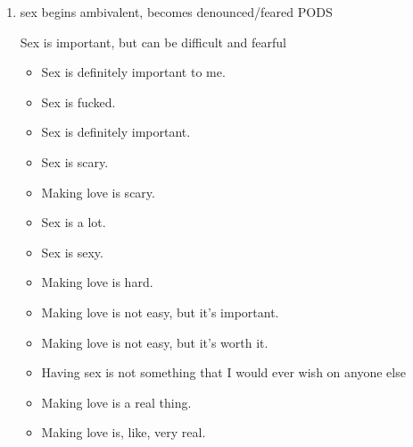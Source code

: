 \documentclass[11pt]{article}
\begin{document}
\begin{enumerate}
\begin{enumerate}
POSTPODS
Intimacy described as desired but deferred:
\begin{itemize}
\item Being intimate with you is something that I've wanted for my entire
life.
\item Being intimate with you is something that I've never experienced.
\item Being intimate with you is something that I've wanted for my whole
life.
\item Being intimate with you is something that I could potentially do.
\item Being intimate with you is the most sacred thing.
\item Being intimate with you is really meaningful.
\item Being intimate with you is something that I need.
\item Being intimate with you is a big deal.
\item Being intimate with you is one of the most important things to me.
\item Being intimate with you is something that I've been looking for
since day one.
\item Being intimate with you is very rare for me.
\end{itemize}

\item sex begins ambivalent, becomes denounced/feared
\label{sec:org0c8fc0b}
PODS

Sex is important, but can be difficult and fearful
\begin{itemize}
\item Sex is definitely important to me.
\item Sex is fucked.
\item Sex is definitely important.
\item Sex is scary.
\item Making love is scary.
\item Sex is a lot.
\item Sex is sexy.
\item Making love is hard.
\item Making love is not easy, but it's important.
\item Making love is not easy, but it's worth it.
\item Having sex is not something that I would ever wish on anyone else
\item Making love is a real thing.
\item Making love is, like, very real.
\end{itemize}


\end{enumerate}
\end{enumerate}
\end{document}
